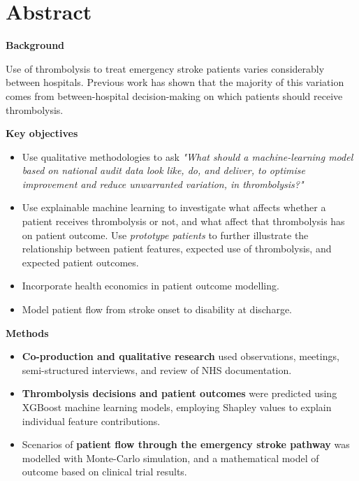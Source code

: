\documentclass{article}
\begin{document}
\section*{}

\section{Abstract}

\textbf{Background}

Use of thrombolysis to treat emergency stroke patients varies considerably between hospitals. Previous work has shown that the majority of this variation comes from between-hospital decision-making on which patients should receive thrombolysis.

\textbf{Key objectives} %

\begin{itemize}

    \item Use qualitative methodologies to ask \textit{"What should a machine-learning model based on national audit data look like, do, and deliver, to optimise improvement and reduce unwarranted variation, in thrombolysis?"}

    \item Use explainable machine learning to investigate what affects whether a patient receives thrombolysis or not, and what affect that thrombolysis has on patient outcome. Use \textit{prototype patients} to further illustrate the relationship between patient features, expected use of thrombolysis, and expected patient outcomes.
    
    \item Incorporate health economics in patient outcome modelling.

    \item Model patient flow from stroke onset to disability at discharge. 

\end{itemize}


\textbf{Methods}

\begin{itemize}

    \item \textbf{Co-production and qualitative research} used observations, meetings, semi-structured interviews, and review of NHS documentation.

    \item \textbf{Thrombolysis decisions and patient outcomes} were predicted using XGBoost machine learning models, employing Shapley values to explain individual feature contributions.

    \item Scenarios of \textbf{patient flow through the emergency stroke pathway} was modelled with Monte-Carlo simulation, and a mathematical model of outcome based on clinical trial results.
    
\end{itemize}
\end{document}
